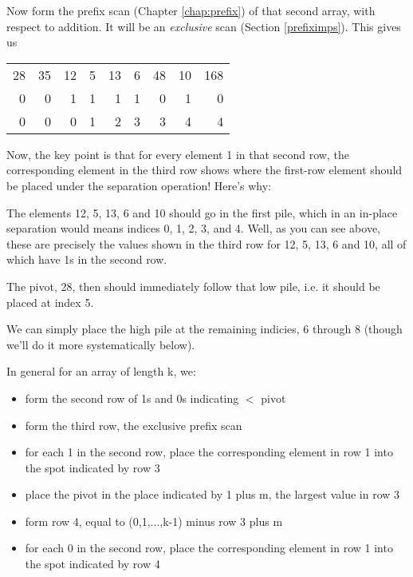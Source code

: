 Now form the prefix scan (Chapter \ref{chap:prefix}) of that second
array, with respect to addition.  It will be an {\it exclusive} scan
(Section \ref{prefiximps}).  This gives us

\begin{tabular}{rrrrrrrrr}
28 & 35 & 12  & 5 & 13  & 6  & 48 & 10 & 168 \\
0  &  0 &  1  & 1 &  1  & 1  & 0  &  1 &  0 \\
0  &  0 &  0  & 1 &  2  & 3  & 3  &  4 &  4 \\
\end{tabular}

Now, the key point is that for every element 1 in that second row, the
corresponding element in the third row shows where the first-row element
should be placed under the separation operation!  Here's why:

The elements 12, 5, 13, 6 and 10 should go in the first pile, which in
an in-place separation would means indices 0, 1, 2, 3, and 4.  Well, as
you can see above, these are precisely the values shown in the third
row for 12, 5, 13, 6 and 10, all of which have 1s in the second row.

The pivot, 28, then should immediately follow that low pile, i.e. it
should be placed at index 5.

We can simply place the high pile at the remaining indicies, 6 through 8
(though we'll do it more systematically below).

In general for an array of length k, we:

\begin{itemize}

\item form the second row of 1s and 0s indicating $<$ pivot

\item form the third row, the exclusive prefix scan

\item for each 1 in the second row, place the corresponding element in
row 1 into the spot indicated by row 3

\item place the pivot in the place indicated by 1 plus m, the largest value
in row 3

\item form row 4, equal to (0,1,...,k-1) minus row 3 plus m

\item for each 0 in the second row, place the corresponding element in
row 1 into the spot indicated by row 4

\end{itemize}

